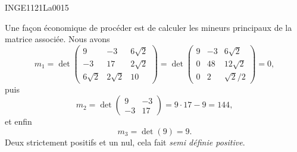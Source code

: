 

\begin{corrige}{INGE1121La0015}

	Une façon économique de procéder est de calculer les mineurs principaux de la matrice associée. Nous avons
	\begin{equation}
		m_1=\det
		\begin{pmatrix}
			9	&	-3	&	6\sqrt{2}	\\
			-3	&	17	&	2\sqrt{2}	\\
			6\sqrt{2}	&	2\sqrt{2}	&	10
		\end{pmatrix}=\det
		\begin{pmatrix}
			9	&	-3	&	6\sqrt{2}	\\
			0	&	48	&	12\sqrt{2}	\\
			0	&	2	&	\sqrt{2}/2
		\end{pmatrix}=0,
	\end{equation}
	puis
	\begin{equation}
		m_2=\det\begin{pmatrix}
			9	&	-3	\\ 
			-3	&	17	
		\end{pmatrix}=9\cdot 17-9=144,
	\end{equation}
	et enfin
	\begin{equation}
		m_3=\det(9)=9.
	\end{equation}
	Deux strictement positifs et un nul, cela fait \emph{semi définie positive}.

\end{corrige}

